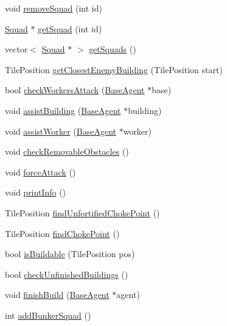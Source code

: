 \begin{DoxyCompactItemize}
\item 
void \hyperlink{class_commander_aa3e2dec3072ee0073c23f68a4b998f44}{remove\-Squad} (int id)
\item 
\hyperlink{class_squad}{Squad} $\ast$ \hyperlink{class_commander_a8c6bd83b95123950edb161ef4395ce0d}{get\-Squad} (int id)
\item 
vector$<$ \hyperlink{class_squad}{Squad} $\ast$ $>$ \hyperlink{class_commander_a16a3392a4e017bc4e4805370cbd6fec1}{get\-Squads} ()
\item 
Tile\-Position \hyperlink{class_commander_acd7ff7aa80811bf820e83ad46eec6e48}{get\-Closest\-Enemy\-Building} (Tile\-Position start)
\item 
bool \hyperlink{class_commander_afa0bccc42094d96c0f2ff94dcf224ae8}{check\-Workers\-Attack} (\hyperlink{class_base_agent}{Base\-Agent} $\ast$base)
\item 
void \hyperlink{class_commander_a3d0b1656a2ef98afec99238ef04692b7}{assist\-Building} (\hyperlink{class_base_agent}{Base\-Agent} $\ast$building)
\item 
void \hyperlink{class_commander_a5fb987bb896051ddccaab1d178af4ccf}{assist\-Worker} (\hyperlink{class_base_agent}{Base\-Agent} $\ast$worker)
\item 
void \hyperlink{class_commander_a5f662ddf34b3411ccb690a2691f49220}{check\-Removable\-Obstacles} ()
\item 
void \hyperlink{class_commander_a32b55d75388cd7bfcdde91bc4f558d76}{force\-Attack} ()
\item 
void \hyperlink{class_commander_a5e5188ef8f95e452c1d30a6c7146c97d}{print\-Info} ()
\item 
Tile\-Position \hyperlink{class_commander_a170195e145723a042fd7a414425ea779}{find\-Unfortified\-Choke\-Point} ()
\item 
Tile\-Position \hyperlink{class_commander_a7e3be4f5cd6a9c32db70a4529ab860ad}{find\-Choke\-Point} ()
\item 
bool \hyperlink{class_commander_a11fdf9b3e5dd486d22e9e562a80d0f27}{is\-Buildable} (Tile\-Position pos)
\item 
bool \hyperlink{class_commander_a76b10404ae1451a7f6dbe5b5b114b539}{check\-Unfinished\-Buildings} ()
\item 
void \hyperlink{class_commander_afb4bbb91ac59260727f9efd7e2abe577}{finish\-Build} (\hyperlink{class_base_agent}{Base\-Agent} $\ast$agent)
\item 
int \hyperlink{class_commander_a3ce4baacd61123b9ddfd1f0714880379}{add\-Bunker\-Squad} ()
\end{DoxyCompactItemize}
